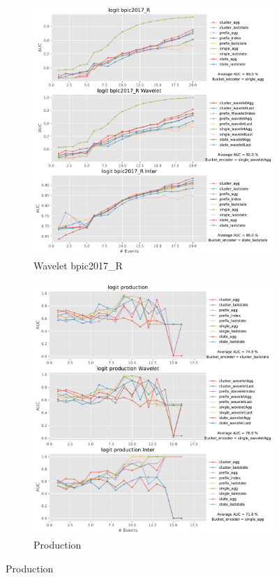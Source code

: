 \documentclass[twoside,11pt]{Latex/Classes/PhDthesisPSnPDF}
\begin{document}
\begin{figure}[!htbp] %
	
	\begin{subfigure}{0.48\textwidth}
		\includegraphics[width=\linewidth]{images/inter/logit/bpic2017_R.pdf}
		\caption{Wavelet bpic2017\_R} \label{fig:b17ri}
	\end{subfigure}\hspace*{\fill}
	\begin{subfigure}{0.48\textwidth}
		\includegraphics[width=\linewidth]{images/inter/logit//production.pdf}
		\caption{Production} \label{fig:proi}
	\end{subfigure}\hspace*{\fill}


\end{figure}
\end{document}
